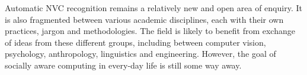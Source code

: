 
Automatic \ac{NVC} recognition remains a relatively new and open area of enquiry. It is also fragmented between various academic disciplines, each with their own practices, jargon and methodologies. The field is likely to benefit from exchange of ideas from these different groups, including between computer vision, psychology, anthropology, linguistics and engineering. However, the goal of socially aware computing in every-day life is still some way away.
